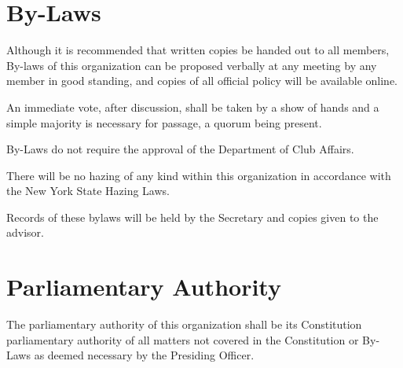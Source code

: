 \section{By-Laws}
\begin{subroutines}
\item Although it is recommended that written copies be handed out to all members, By-laws of this organization can be proposed verbally at any meeting by any member in good standing, and copies of all official policy will be available online.
\item An immediate vote, after discussion, shall be taken by a show of hands and a simple majority is necessary for passage, a quorum being present.
\item By-Laws do not require the approval of the Department of Club Affairs.
\item There will be no hazing of any kind within this organization in accordance with the New York State Hazing Laws.
\item Records of these bylaws will be held by the Secretary and copies given to the advisor.
\end{subroutines}

\section{Parliamentary Authority}
\begin{subroutines}
\item The parliamentary authority of this organization shall be its Constitution parliamentary authority of all matters not covered in the Constitution or By-Laws as deemed necessary by the Presiding Officer.
\end{subroutines}


